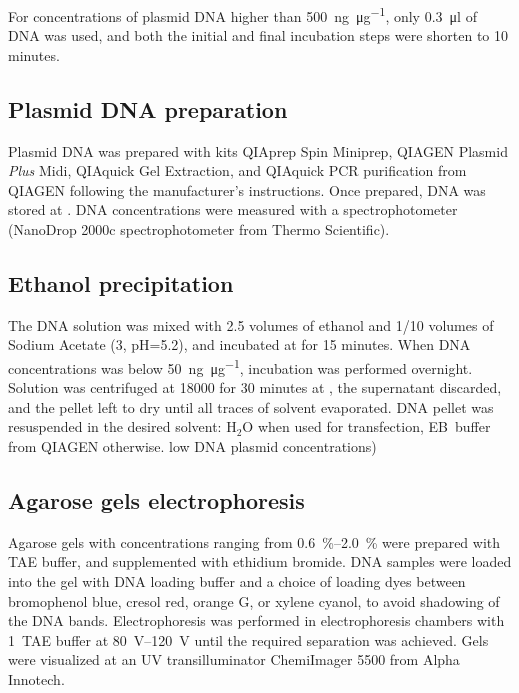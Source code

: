       For concentrations of plasmid DNA higher than \SI{500}{\ng\per\ug}, only
      \SI{0.3}{\ul} of DNA was used, and both the initial and final incubation
      steps were shorten to 10 minutes.

    \subsection{Plasmid DNA preparation}
      Plasmid DNA was prepared with kits QIAprep Spin Miniprep,
      QIAGEN Plasmid \textit{Plus} Midi, QIAquick Gel Extraction, and QIAquick
      PCR purification from QIAGEN following the manufacturer's instructions.
      Once prepared, DNA was stored at . DNA concentrations were measured
      with a spectrophotometer (NanoDrop 2000c spectrophotometer from
      Thermo Scientific).

    \subsection{Ethanol precipitation}
      \label{sec:ethanol-precipitation}
      The DNA solution was mixed with \num{2.5} volumes of  ethanol
      and \num{1/10} volumes of Sodium Acetate (\SI{3}{\Molar}, pH=\num{5.2}),
      and incubated at  for 15 minutes. When DNA concentrations was below
      \SI{50}{\ng\per\ug}, incubation was performed overnight.
      Solution was centrifuged at
      \SI{18000}{\gn} for 30 minutes at , the supernatant discarded, and
      the pellet left to dry until all traces of solvent evaporated. DNA pellet
      was resuspended in the desired solvent: H$_2$O when used for transfection,
      EB~buffer from QIAGEN otherwise.
      low DNA plasmid concentrations)

    \subsection{Agarose gels electrophoresis}
      Agarose gels with concentrations ranging from \SIrange{0.6}{2.0}{\percent}
      were prepared with TAE buffer, and supplemented with ethidium bromide.
      DNA samples were loaded into the gel with DNA loading buffer and a
      choice of loading dyes between bromophenol blue, cresol red, orange G, or
      xylene cyanol, to avoid shadowing of the DNA bands. Electrophoresis was
      performed in electrophoresis chambers with \SI{1}{\X}~TAE buffer at
      \SIrange{80}{120}{\volt} until the required separation was achieved.
      Gels were visualized at an UV transilluminator ChemiImager 5500 from
      Alpha Innotech.

